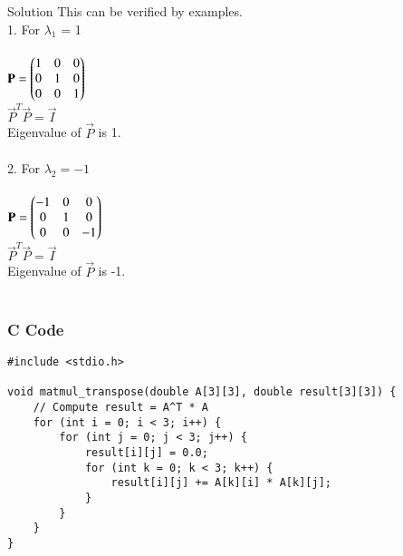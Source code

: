 \documentclass{beamer}
\begin{document}
\begin{frame}{Solution}
This can be verified by examples.\\ 
1. For $\lambda_1$ = 1 \\ \\
$\mathbf{P} = \begin{pmatrix}1 & 0 & 0 \\ 0 & 1 & 0 \\ 0 & 0 & 1\end{pmatrix}$ \\
$\vec{P}^T\vec{P} = \vec{I}$ \\
Eigenvalue of $\vec{P}$ is 1. \\ \\
2. For $\lambda_2 = -1$ \\ \\
$\mathbf{P} = \begin{pmatrix}-1 & 0 & 0 \\ 0 & 1 & 0 \\ 0 & 0 & -1\end{pmatrix}$ \\
$\vec{P}^T\vec{P} = \vec{I}$ \\
Eigenvalue of $\vec{P}$ is -1. \\ \\
\end{frame}

\begin{frame}[fragile]
    \frametitle{C Code}
    \begin{lstlisting}
#include <stdio.h>

void matmul_transpose(double A[3][3], double result[3][3]) {
    // Compute result = A^T * A
    for (int i = 0; i < 3; i++) {
        for (int j = 0; j < 3; j++) {
            result[i][j] = 0.0;
            for (int k = 0; k < 3; k++) {
                result[i][j] += A[k][i] * A[k][j];
            }
        }
    }
}




    \end{lstlisting}
\end{frame}
\end{document}
